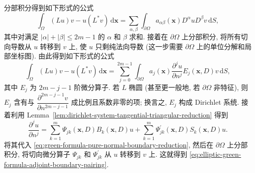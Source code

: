 \begin{Proof}
分部积分得到如下形式的公式
\begin{equation}\label{eq:green-formula-raw-boundary-derivative-sum}
\int_\Omega(Lu)v-u(L^*v)\,\mathrm{d}\bm{x}=\sum_{\alpha,\beta}\int_{\partial\Omega}a_{\alpha\beta}(\bm{x})D^\alpha uD^\beta v\,\mathrm{d}S,
\end{equation}
其中对满足 $|\alpha|+|\beta|\leq2m-1$ 的 $\alpha$ 和 $\beta$ 求和. 接着在 $\partial\Omega$ 上分部积分, 将所有切向导数从 $u$ 转移到 $v$ 上, 使 $u$ 只剩纯法向导数 (这一步需要 $\partial\Omega$ 上的单位分解和局部坐标图). 由此得到如下形式的公式
\begin{equation}\label{eq:green-formula-pure-normal-boundary-reduction}
\int_\Omega(Lu)v-u(L^*v)\,\mathrm{d}\bm{x}=\sum_{j=0}^{2m-1}\int_{\partial\Omega}a_j(\bm{x})\frac{\partial^ju}{\partial n^j}E_j(\bm{x},D)v\,\mathrm{d}S,
\end{equation}
其中 $E_j$ 为 $2m-j-1$ 阶微分算子. 若 $L$ 椭圆 (甚至更一般地, 若 $\partial\Omega$ 非特征), 则 $E_j$ 含有与 $\dfrac{\partial^{2m-j-1}v}{\partial n^{2m-j-1}}$ 成比例且系数非零的项; 换言之, $E_j$ 构成 Dirichlet 系统. 接着利用 Lemma~\ref{lem:dirichlet-system-tangential-triangular-reduction} 得到
\begin{equation}\label{eq:green-formula-normal-derivative-dirichlet-system-expansion}
\frac{\partial^ju}{\partial n^j}=\sum_{k=1}^m\Psi_{jk}(\bm{x},D)B_k(\bm{x},D)u+\sum_{k=1}^m\Psi_{jk}^{\prime}(\bm{x},D)S_k(\bm{x},D)u.
\end{equation}
将其代入 \eqref{eq:green-formula-pure-normal-boundary-reduction}, 然后在 $\partial\Omega$ 上分部积分, 将切向微分算子 $\Psi_{jk}$ 和 $\Psi_{jk}^{\prime}$ 从 $u$ 转移到 $v$ 上. 这就得到 \eqref{eq:elliptic-green-formula-adjoint-boundary-pairing}.


\end{Proof}
